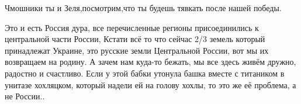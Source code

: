 Чмошники ты и Зеля,посмотрим,что ты будешь тявкать после нашей победы.


Это и есть Россия дура, все перечисленные регионы присоединились к центральной
части России, Кстати всё то что сейчас 2/3 земель который принадлежат Украине,
это русские земли Центральной России, вот мы их возвращаем на родину. А зачем
нам куда-то бежать, мы все здесь живём дружно, радостно и счастливо. Если у
этой бабки утонула башка вместе с титаником в унитазе хохляцком, который надели
ей на голову хохлы, то это же её проблема, а не России..

